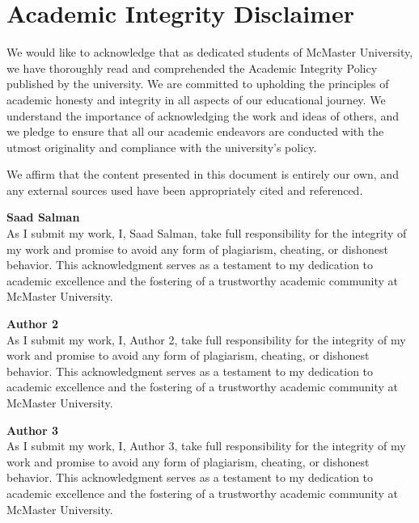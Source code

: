 \documentclass[12pt,letterpaper]{article}
\title{}
\author{}
\date{}
\begin{document}
\maketitle
\thispagestyle{empty}
\clearpage

\tableofcontents
\clearpage

\section*{Academic Integrity Disclaimer}
We would like to acknowledge that as dedicated students of McMaster University, we have thoroughly read and comprehended the Academic Integrity Policy published by the university. We are committed to upholding the principles of academic honesty and integrity in all aspects of our educational journey. We understand the importance of acknowledging the work and ideas of others, and we pledge to ensure that all our academic endeavors are conducted with the utmost originality and compliance with the university’s policy.

We affirm that the content presented in this document is entirely our own, and any external sources used have been appropriately cited and referenced.

\medskip
\noindent\textbf{Saad Salman} \\
As I submit my work, I, Saad Salman, take full responsibility for the integrity of my work and promise to avoid any form of plagiarism, cheating, or dishonest behavior. This acknowledgment serves as a testament to my dedication to academic excellence and the fostering of a trustworthy academic community at McMaster University.

\medskip
\noindent\textbf{Author 2} \\
As I submit my work, I, Author 2, take full responsibility for the integrity of my work and promise to avoid any form of plagiarism, cheating, or dishonest behavior. This acknowledgment serves as a testament to my dedication to academic excellence and the fostering of a trustworthy academic community at McMaster University.

\medskip
\noindent\textbf{Author 3} \\
As I submit my work, I, Author 3, take full responsibility for the integrity of my work and promise to avoid any form of plagiarism, cheating, or dishonest behavior. This acknowledgment serves as a testament to my dedication to academic excellence and the fostering of a trustworthy academic community at McMaster University.
\end{document}
